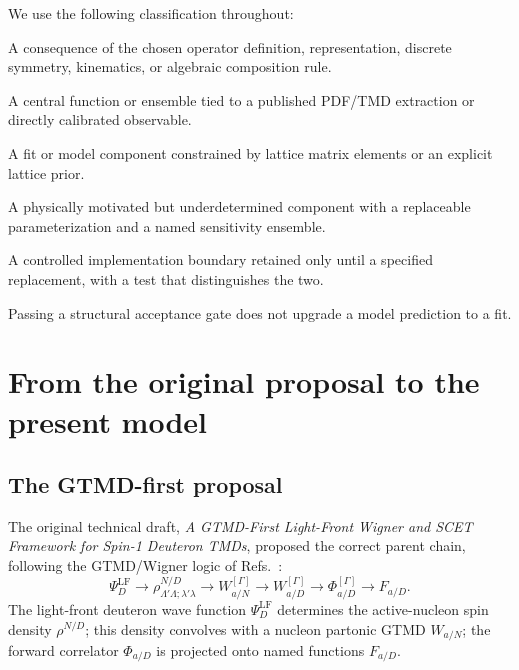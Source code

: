 \documentclass[11pt]{article}
\newcommand{\LF}{\mathrm{LF}}
\newcommand{\status}[1]{\textsf{\textbf{#1}}}
\newcommand{\exact}{\status{Exact}}
\newcommand{\fit}{\status{Fit/phenomenology}}
\newcommand{\model}{\status{Model}}
\newcommand{\temporary}{\status{Temporary}}
\begin{document}
We use the following classification throughout:
\begin{description}[leftmargin=2.2cm,style=nextline]
  \item[\exact] A consequence of the chosen operator definition,
  representation, discrete symmetry, kinematics, or algebraic composition
  rule.
  \item[\fit] A central function or ensemble tied to a published PDF/TMD
  extraction or directly calibrated observable.
  \item[\status{Lattice-informed}] A fit or model component constrained by
  lattice matrix elements or an explicit lattice prior.
  \item[\model] A physically motivated but underdetermined component with a
  replaceable parameterization and a named sensitivity ensemble.
  \item[\temporary] A controlled implementation boundary retained only
  until a specified replacement, with a test that distinguishes the two.
\end{description}
Passing a structural acceptance gate does not upgrade a model prediction
to a fit.

\section{From the original proposal to the present model}
\label{sec:history}

\subsection{The GTMD-first proposal}

The original technical draft, \emph{A GTMD-First Light-Front Wigner and
SCET Framework for Spin-1 Deuteron TMDs}, proposed the correct parent
chain, following the GTMD/Wigner logic of
Refs.~\cite{Belitsky2004,Lorce2011}:
\begin{equation}
\Psi_D^{\LF}
\longrightarrow
\rho_{\Lambda'\Lambda;\lambda'\lambda}^{N/D}
\longrightarrow
W_{a/N}^{[\Gamma]}
\longrightarrow
W_{a/D}^{[\Gamma]}
\longrightarrow
\Phi_{a/D}^{[\Gamma]}
\longrightarrow
F_{a/D}.
\label{eq:parent-chain}
\end{equation}
The light-front deuteron wave function \(\Psi_D^{\LF}\) determines the
active-nucleon spin density \(\rho^{N/D}\); this density convolves with a
nucleon partonic GTMD \(W_{a/N}\); the forward correlator
\(\Phi_{a/D}\) is projected onto named functions \(F_{a/D}\).
\end{document}
